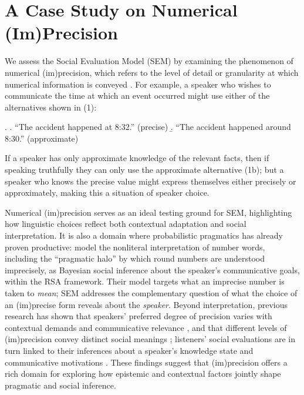 \documentclass[12pt,a4paper]{article}
\begin{document}
\section{A Case Study on Numerical (Im)Precision}
\label{sec:imprecision}

We assess the Social Evaluation Model (SEM) by examining the phenomenon of
numerical (im)precision, which refers to the level of detail or granularity at
which numerical information is conveyed \citep{krifka2009}. For example, a
speaker who wishes to communicate the time at which an event occurred might use
either of the alternatives shown in (1):

\ex. \a. ``The accident happened at 8:32.'' \hfill(precise)
     \b. ``The accident happened around 8:30.'' \hfill(approximate)

\noindent If a speaker has only approximate knowledge of the relevant facts,
then if speaking truthfully they can only use the approximate alternative (1b);
but a speaker who knows the precise value might express themselves either
precisely or approximately, making this a situation of speaker choice.

Numerical (im)precision serves as an ideal testing ground for SEM, highlighting
how linguistic choices reflect both contextual adaptation and social
interpretation. It is also a domain where probabilistic pragmatics has already
proven productive: \citet{kao2014} model the nonliteral interpretation of number
words, including the ``pragmatic halo'' by which round numbers are understood
imprecisely, as Bayesian social inference about the speaker's communicative
goals, within the RSA framework. Their model targets what an imprecise number is
taken to \emph{mean}; SEM addresses the complementary question of what the choice
of an (im)precise form reveals about the \emph{speaker}. Beyond interpretation,
previous research has shown that speakers' preferred degree of precision varies
with contextual demands and communicative relevance
\citep{vanderhenst2002,muehlenberndsolt2022}, and that different levels of
(im)precision convey distinct social meanings \citep{beltrama2018,beltramaetal2022};
listeners' social evaluations are in turn linked to their inferences about a
speaker's knowledge state and communicative motivations \citep{soltEtAl2025}.
These findings suggest that (im)precision offers a rich domain for exploring how
epistemic and contextual factors jointly shape pragmatic and social inference.
\end{document}
